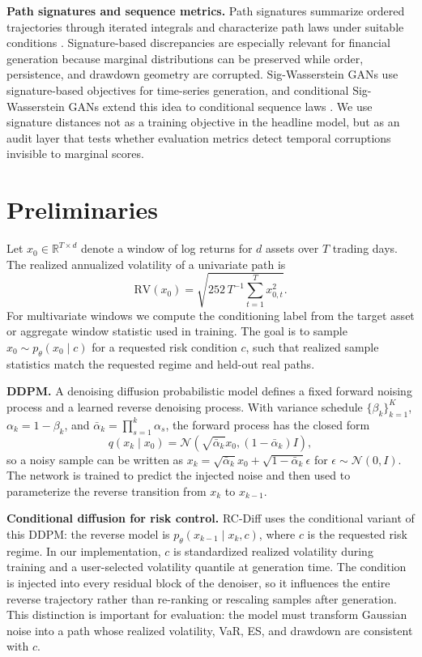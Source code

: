 \documentclass[letterpaper]{article}
\begin{document}
\textbf{Path signatures and sequence metrics.} Path signatures summarize ordered trajectories through iterated integrals and characterize path laws under suitable conditions \citep{lyons1998differential,chevyrev2016primer,chevyrev2018characteristic}. Signature-based discrepancies are especially relevant for financial generation because marginal distributions can be preserved while order, persistence, and drawdown geometry are corrupted. Sig-Wasserstein GANs use signature-based objectives for time-series generation, and conditional Sig-Wasserstein GANs extend this idea to conditional sequence laws \citep{ni2021sigwgan,liao2023conditional}. We use signature distances not as a training objective in the headline model, but as an audit layer that tests whether evaluation metrics detect temporal corruptions invisible to marginal scores.

\section{Preliminaries}
Let $x_0 \in \mathbb{R}^{T \times d}$ denote a window of log returns for $d$ assets over $T$ trading days. The realized annualized volatility of a univariate path is
\begin{equation}
  \mathrm{RV}(x_0)=\sqrt{252\,T^{-1}\sum_{t=1}^{T} x_{0,t}^2}.
\end{equation}
For multivariate windows we compute the conditioning label from the target asset or aggregate window statistic used in training. The goal is to sample $\hat{x}_0\sim p_\theta(x_0\mid c)$ for a requested risk condition $c$, such that realized sample statistics match the requested regime and held-out real paths.

\textbf{DDPM.} A denoising diffusion probabilistic model defines a fixed forward noising process and a learned reverse denoising process. With variance schedule $\{\beta_k\}_{k=1}^{K}$, $\alpha_k=1-\beta_k$, and $\bar{\alpha}_k=\prod_{s=1}^{k}\alpha_s$, the forward process has the closed form
\begin{equation}
  q(x_k\mid x_0)=\mathcal{N}\!\left(\sqrt{\bar{\alpha}_k}x_0,(1-\bar{\alpha}_k)I\right),
\end{equation}
so a noisy sample can be written as $x_k=\sqrt{\bar{\alpha}_k}x_0+\sqrt{1-\bar{\alpha}_k}\epsilon$ for $\epsilon\sim\mathcal{N}(0,I)$. The network is trained to predict the injected noise and then used to parameterize the reverse transition from $x_k$ to $x_{k-1}$.

\textbf{Conditional diffusion for risk control.} RC-Diff uses the conditional variant of this DDPM: the reverse model is $p_\theta(x_{k-1}\mid x_k,c)$, where $c$ is the requested risk regime. In our implementation, $c$ is standardized realized volatility during training and a user-selected volatility quantile at generation time. The condition is injected into every residual block of the denoiser, so it influences the entire reverse trajectory rather than re-ranking or rescaling samples after generation. This distinction is important for evaluation: the model must transform Gaussian noise into a path whose realized volatility, VaR, ES, and drawdown are consistent with $c$.
\end{document}
